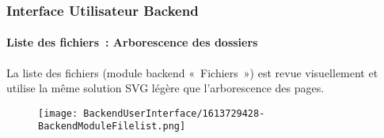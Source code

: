 %

\begin{frame}[fragile]
	\frametitle{Interface Utilisateur Backend}
	\framesubtitle{Liste des fichiers~: Arborescence des dossiers}

	La liste des fichiers (module backend «~Fichiers~») est revue visuellement et
	utilise la même solution SVG légère que l'arborescence des pages.

	\begin{figure}
		\texttt{[image: BackendUserInterface/1613729428-BackendModuleFilelist.png]}
	\end{figure}

\end{frame}

